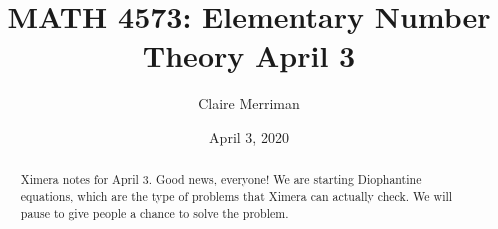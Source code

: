 \documentclass{xourse}
\title{MATH 4573: Elementary Number Theory April 3}
\author{Claire Merriman}
\date{April 3, 2020}
\begin{document}
  
\begin{abstract} %
Ximera notes for April 3. Good news, everyone! We are starting Diophantine equations, which are the type of problems that Ximera can actually check. We will pause to give people a chance to solve the problem.
\end{abstract}  
\maketitle 
 
 
\end{document}
